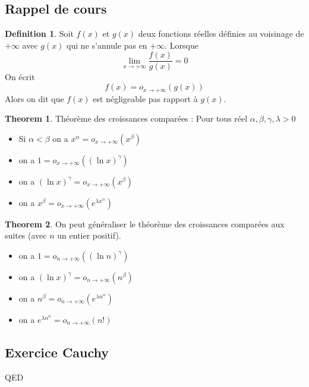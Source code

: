 \documentclass[]{book}
\theoremstyle{definition}
\newtheorem{defn}{Definition}
\newtheorem{thm}{Theorem}
\begin{document}
\subsection*{Rappel de cours}

\begin{defn}
Soit $f(x)$ et $g(x)$ deux fonctions r\'eelles d\'efinies au voisinage de $+\infty$ avec $g(x)$ qui ne s'annule pas en $+\infty$. Lorsque 	
$$\lim_{x \to +\infty}\frac{f(x)}{g(x)} = 0$$
On \'ecrit
$$f(x) = o_{x \to +\infty}(g(x))$$
Alors on dit que $f(x)$ est n\'egligeable pas rapport \`a $g(x)$.\\
\end{defn}


\begin{thm}
Th\'eor\`eme des croissances compar\'ees : Pour tous r\'eel $\alpha,\beta, \gamma, \lambda >0$
\begin{itemize}
\item Si $\alpha < \beta$ on a $x^{\alpha} = o_{x \to +\infty}(x^{\beta})$
\item on a $1 = o_{x \to +\infty}((\ln x)^{\gamma})$
\item on a $(\ln x)^{\gamma} = o_{x \to +\infty}(x^{\beta})$
\item on a $x^{\beta} = o_{x \to +\infty}(e^{\lambda x^{\alpha}})$
\end{itemize}
\end{thm}


\begin{thm}
On peut g\'en\'eraliser le th\'eor\`eme des croissances compar\'ees aux suites (avec $n$ un entier positif).
\begin{itemize}
\item on a $1 = o_{n \to +\infty}((\ln n)^{\gamma})$
\item on a $(\ln x)^{\gamma} = o_{n \to +\infty}(n^{\beta})$
\item on a $n^{\beta} = o_{n \to +\infty}(e^{\lambda n^{\alpha}})$
\item on a $e^{\lambda n^{\alpha}} = o_{n \to +\infty}(n!)$
\end{itemize}
\end{thm}

\newpage
\subsection*{Exercice Cauchy}



QED
\end{document}
